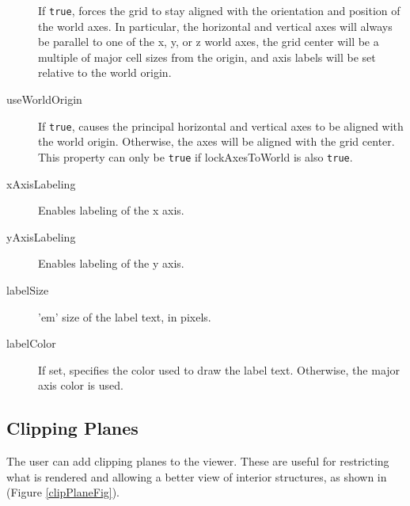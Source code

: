 \documentclass{article}
\begin{document}
\begin{description}
If {\tt true}, forces the grid to stay aligned with the orientation
and position of the world axes. In particular, the horizontal and
vertical axes will always be parallel to one of the x, y, or z world
axes, the grid center will be a multiple of major cell sizes from the
origin, and axis labels will be set relative to the world origin.

\item[useWorldOrigin]\mbox{}

If {\tt true}, causes the principal horizontal and vertical axes to be
aligned with the world origin. Otherwise, the axes will be aligned
with the grid center. This property can only be {\tt true} if {\sf
lockAxesToWorld} is also {\tt true}.

\item[xAxisLabeling]\mbox{}

Enables labeling of the x axis.

\item[yAxisLabeling]\mbox{}

Enables labeling of the y axis.

\item[labelSize]\mbox{}

'em' size of the label text, in pixels.

\item[labelColor]\mbox{}

If set, specifies the color used to draw the label text. Otherwise,
the major axis color is used.

\end{description}

\subsection{Clipping Planes}
\label{ClippingPlanesSec}

The user can add clipping planes to the viewer. These are useful for
restricting what is rendered and allowing a better view of interior
structures, as shown in (Figure \ref{clipPlaneFig}).
\end{document}
